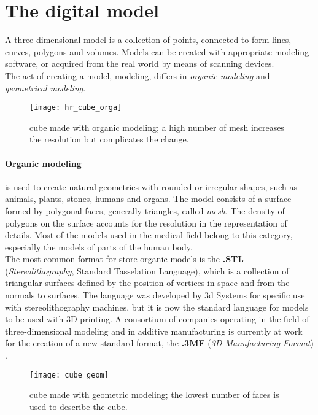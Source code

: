 \section{The digital model}
A three-dimensional model is a collection of points, connected to form lines, curves, polygons and volumes. Models can be created with appropriate modeling software, or acquired from the real world by means of scanning devices. \\
The act of creating a model, modeling, differs in \emph{organic modeling} and \emph{geometrical modeling}.
\begin{wrapfigure}{R}{0.35\textwidth}
\texttt{[image: hr\_cube\_orga]}
    \caption{cube made with organic modeling; a high number of mesh increases the resolution but complicates the change.}
    \label{fig: hr_cube_orga}
\end{wrapfigure}
\paragraph{Organic modeling} is used to create natural geometries with rounded or irregular shapes, such as animals, plants, stones, humans and organs. The model consists of a surface formed by polygonal faces, generally triangles, called \emph{mesh}. The density of polygons on the surface accounts for the resolution in the representation of details. Most of the models used in the medical field belong to this category, especially the models of parts of the human body. \\
The most common format for store organic models is the \textbf{.STL} (\emph{Stereolithography}, Standard Tasselation Language), which is a collection of triangular surfaces defined by the position of vertices in space and from the normals to surfaces. The language was developed by 3d Systems for specific use with stereolithography machines, but it is now the standard language for models to be used with 3D printing. A consortium of companies operating in the field of three-dimensional modeling and in additive manufacturing is currently at work for the creation of a new standard format, the \textbf{.3MF} (\emph{3D Manufacturing Format}) \parencite{Reference143}.
\begin{wrapfigure}{R}{0.35\textwidth}
\texttt{[image: cube\_geom]}
    \caption {cube made with geometric modeling; the lowest number of faces is used to describe the cube.}
    \label {fig: cube_geom}
\end{wrapfigure}
